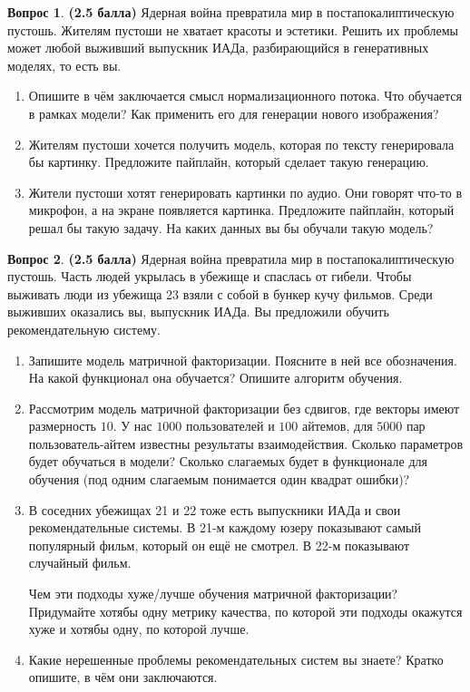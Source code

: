 \documentclass[12pt]{article}
\theoremstyle{definition}
\newtheorem{question}{Вопрос}
\begin{document}
\begin{question} \textbf{(2.5 балла)} \newline
    Ядерная война превратила мир в постапокалиптическую пустошь. Жителям пустоши не хватает красоты и эстетики. Решить их проблемы может любой выживший выпускник ИАДа, разбирающийся в генеративных моделях, то есть вы.
    \begin{enumerate}
        \item Опишите  в чём заключается смысл нормализационного потока. Что обучается в рамках модели? Как применить его для генерации нового изображения? 
        \item Жителям пустоши хочется получить модель, которая по тексту генерировала бы картинку. Предложите пайплайн, который сделает такую генерацию.
        \item Жители пустоши хотят генерировать картинки по аудио. Они говорят что-то в микрофон, а на экране появляется картинка. Предложите пайплайн, который решал бы такую задачу. На каких данных вы бы обучали такую модель?
    \end{enumerate}
\end{question}

\newpage

\begin{question} \textbf{(2.5 балла)} \newline
    Ядерная война превратила мир в постапокалиптическую пустошь. Часть людей укрылась в убежище и спаслась от гибели. Чтобы выживать люди из убежища 23 взяли с собой в бункер кучу фильмов. Среди выживших оказались вы, выпускник ИАДа. Вы предложили обучить рекомендательную систему.
    \begin{enumerate}
        \item Запишите модель матричной факторизации. Поясните в ней все обозначения. На какой функционал она обучается? Опишите алгоритм обучения.
    
        \item Рассмотрим модель матричной факторизации без сдвигов, где векторы имеют размерность $10.$ У нас $1000$ пользователей и $100$ айтемов, для $5000$ пар пользователь-айтем известны результаты взаимодействия. Сколько параметров будет обучаться в модели? Сколько слагаемых будет в функционале для обучения (под одним слагаемым понимается один квадрат ошибки)?
        
        \item В соседних убежищах 21 и 22 тоже есть выпускники ИАДа и свои рекомендательные системы. В 21-м каждому юзеру показывают самый популярный фильм, который он ещё не смотрел. В 22-м показывают случайный фильм. 
        
        Чем эти подходы хуже/лучше обучения матричной факторизации? Придумайте хотябы одну метрику качества, по которой эти подходы окажутся хуже и хотябы одну, по которой лучше.

        \item Какие нерешенные проблемы рекомендательных систем вы знаете? Кратко опишите, в чём они заключаются. 
    \end{enumerate}
\end{question}
\end{document}
